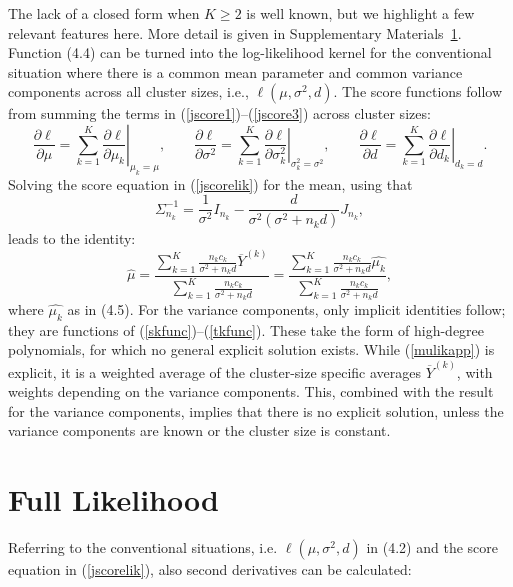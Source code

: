 \documentclass[11pt,a5paper,twoside]{book}
\begin{document}
{The lack of a closed form when $K\ge 2$ is well known, but we highlight a few relevant features here. More detail is given in Supplementary Materials~\ref{appB}.
Function (4.4)
can be turned into the log-likelihood kernel for the conventional situation where there is a common mean parameter and common variance components across all cluster sizes, i.e., $\ell(\mu,\sigma^2,d)$. The score functions follow from summing the terms in (\ref{jscore1})--(\ref{jscore3}) across cluster sizes:
\begin{equation}
\label{jscorelik}
\frac{\partial \ell}{\partial \mu}=
\sum_{k=1}^K\left.\frac{\partial \ell}{\partial \mu_k}\right|_{\mu_k=\mu},\qquad
\frac{\partial \ell}{\partial \sigma^2}=
\sum_{k=1}^K\left.\frac{\partial \ell}{\partial \sigma^2_k}\right|_{\sigma^2_k=\sigma^2},
\qquad
\frac{\partial \ell}{\partial d}=
\sum_{k=1}^K\left.\frac{\partial \ell}{\partial d_k}\right|_{d_k=d}.
\end{equation}
Solving the score equation in (\ref{jscorelik}) for the mean, using that
$$\Sigma_{n_k}^{-1}=\frac{1}{\sigma^2}I_{n_k}-\frac{d}{\sigma^2(\sigma^2+n_kd)}J_{n_k},$$
leads to the identity:
\begin{equation}
\widehat{\mu}=\frac
{
\sum_{k=1}^K\frac{n_k c_k}{\sigma^2+n_k d} \overline{Y}^{(k)}
}
{
\sum_{k=1}^K\frac{n_k c_k}{\sigma^2+n_k d}
}
=
\frac
{
\sum_{k=1}^K\frac{n_k c_k}{\sigma^2+n_k d} \widehat{\mu_k}
}
{
\sum_{k=1}^K\frac{n_k c_k}{\sigma^2+n_k d}
},
\label{mulikapp}
\end{equation}
where $\widehat{\mu_k}$ as in (4.5).
For the variance components, only implicit identities follow; they are functions of (\ref{skfunc})--(\ref{tkfunc}). These take the form of high-degree polynomials, for which no general explicit solution exists.  While (\ref{mulikapp}) is explicit, it is a weighted average of the cluster-size specific averages $\overline{Y}^{(k)}$, with weights depending on the variance components.  This, combined with the result for the variance components, implies that there is no explicit solution, unless the variance components are known or the cluster size is constant.


\section{Full Likelihood}
 \label{appB}

Referring to the conventional situations, i.e. $\ell(\mu,\sigma^2,d)$ in (4.2)
and the score equation in (\ref{jscorelik}), also second derivatives can be calculated:


}
\end{document}
